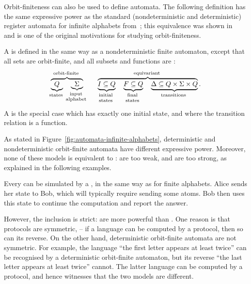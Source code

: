Orbit-finiteness can also be used to define automata. The following definition
has the same expressive power as the standard (nondeterministic and
deterministic) register automata for infinite alphabets
from~\cite{kaminskiFiniteMemoryAutomata1994}; this equivalence was shown
in~\cite[Lemma 6.3]{bojanczykAutomataTheoryNominal2014} and is one of the
original motivations for studying orbit-finiteness.

\begin{definition}
    \label{def:orbit-finite-automata}
    \AP
    A  is defined in the same way as a 
    nondeterministic finite automaton, except that all sets are orbit-finite, 
    and all subsets and functions are :
\begin{align*}
    \myoverbrace{
        \myunderbrace{Q}{states} \quad 
        \myunderbrace{\Sigma}{input \\ alphabet}
    }
    {orbit-finite}
    \qquad
    \myoverbrace{
        \myunderbrace{I \subseteq Q}{initial \\ states} \quad 
        \myunderbrace{F \subseteq Q}{final \\ states} \quad 
        \myunderbrace{\Delta \subseteq Q \times \Sigma \times Q}{transitions}
    }{equivariant}.
\end{align*}
A 
is the special case which has exactly one initial state, and where the transition relation is a function.
\end{definition}

As stated in Figure~\ref{fig:automata-infinite-alphabets}, deterministic and
nondeterministic orbit-finite automata have different expressive power.
Moreover, none of these models is equivalent to :
 are too weak, and 
 are too
strong, as explained in the following examples.

\begin{myexample}
    \label{ex:protocol-not-dofa}
  Every  can be simulated by a 
  ,
  in the same way as for finite alphabets. Alice sends her state to Bob,
  which will typically require sending some atoms. Bob then uses this state
  to continue the computation and report the answer. 
    
  However, the inclusion is strict:  are more powerful than
  . One reason is that protocols are
  symmetric, -- if a language can be computed by a protocol, then so can its
  reverse. On the other hand, deterministic orbit-finite automata are not
  symmetric. For example, the language ``the first letter appears at least
  twice'' can be recognised by a deterministic orbit-finite automaton, but
  its reverse ``the last letter appears at least twice'' cannot. The latter
  language can be computed by a protocol, and hence witnesses that the two
  models are different. 
\end{myexample}

